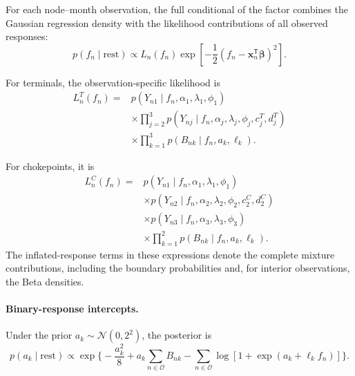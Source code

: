 \documentclass[pdftex,12pt,openright,a4paper,oneside]{book}
\begin{document}
For each node--month observation, the full conditional
of the factor combines the Gaussian regression density
with the likelihood contributions of all observed responses:
\begin{equation}
p(f_n\mid\mathrm{rest})
\propto
L_n(f_n)
\exp\left[
-\frac12
(f_n-\boldsymbol{x}_n^{\mathsf T}\boldsymbol{\beta})^2
\right].
\label{eq:fc_factor}
\end{equation}

For terminals, the observation-specific likelihood is
\begin{equation*}
\begin{aligned}
L_n^T(f_n)
={}&
p(Y_{n1}\mid f_n,\alpha_1,\lambda_1,\phi_1)
\\
&\times
\prod_{j=2}^{3}
p(Y_{nj}\mid
f_n,\alpha_j,\lambda_j,\phi_j,c_j^T,d_j^T)
\\
&\times
\prod_{k=1}^{3}
p(B_{nk}\mid f_n,a_k,\ell_k).
\end{aligned}
\label{eq:terminal_factor_likelihood}
\end{equation*}

For chokepoints, it is
\begin{equation*}
\begin{aligned}
L_n^C(f_n)
={}&
p(Y_{n1}\mid f_n,\alpha_1,\lambda_1,\phi_1)
\\
&\times
p(Y_{n2}\mid
f_n,\alpha_2,\lambda_2,\phi_2,c_2^C,d_2^C)
\\
&\times
p(Y_{n3}\mid f_n,\alpha_3,\lambda_3,\phi_3)
\\
&\times
\prod_{k=1}^{2}
p(B_{nk}\mid f_n,a_k,\ell_k).
\end{aligned}
\label{eq:chokepoint_factor_likelihood}
\end{equation*}
The inflated-response terms in these expressions denote
the complete mixture contributions, including the
boundary probabilities and, for interior observations,
the Beta densities.

\paragraph{Binary-response intercepts.}

Under the prior $a_k\sim\mathcal{N}(0,2^2)$, the posterior is
\begin{equation}
p(a_k\mid\mathrm{rest})
\propto
\exp\Bigg\{-\frac{a_k^2}{8}
+a_k\sum_{n\in\mathcal{O}}B_{nk}-
\sum_{n\in\mathcal{O}}
\log\left[1+\exp(a_k+\ell_k f_n)\right]
\Bigg\}.
\label{eq:fc_binary_intercept_log}
\end{equation}
\end{document}
